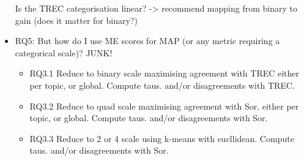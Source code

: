 \begin{itemize}
        Is the TREC categorisation linear? -> recommend mapping from binary to gain (does it matter for binary?)



\item RQ5: But how do I use ME scores for MAP (or any metric requiring a categorical scale)? JUNK!
    \begin{itemize}
        \item RQ3.1 Reduce to binary scale maximising agreement with TREC either per topic, or global.
                    Compute taus. and/or disagreements with TREC.

        \item RQ3.2 Reduce to quad scale maximising agreement with Sor. either per topic, or global.
                    Compute taus. and/or disagreements with Sor.

        \item RQ3.3 Reduce to 2 or 4 scale using k-means with eucllidean.
                    Compute taus. and/or disagreements with Sor.


        
    \end{itemize}
    

\end{itemize}

